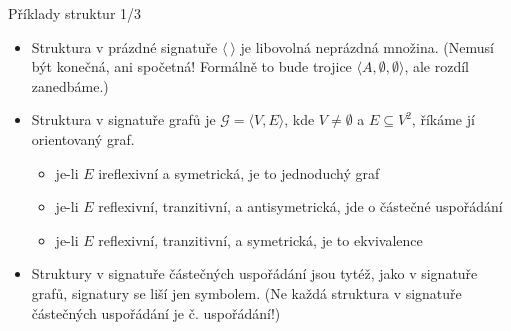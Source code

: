 \documentclass{beamer}
\begin{document}
\begin{frame}{Příklady struktur 1/3}
    
    \begin{itemize}
        \item Struktura \alert{v prázdné signatuře} $\langle\ \rangle$ je libovolná neprázdná množina. (Nemusí být konečná, ani spočetná! Formálně to bude trojice $\langle A,\emptyset,\emptyset\rangle$, ale rozdíl zanedbáme.)            

        \item Struktura \alert{v signatuře grafů} je $\mathcal G=\langle V,E\rangle$, kde $V\neq\emptyset$ a $E\subseteq V^2$, říkáme jí \alert{orientovaný graf}. 
        \begin{itemize}
            \item je-li $E$ ireflexivní a symetrická, je to \alert{jednoduchý} graf
            \item je-li $E$ reflexivní, tranzitivní, a antisymetrická, jde o \alert{částečné uspořádání}
            \item je-li $E$ reflexivní, tranzitivní, a symetrická, je to \alert{ekvivalence}
        \end{itemize}
        \item Struktury \alert{v signatuře částečných uspořádání} jsou tytéž, jako v signatuře grafů, signatury se liší jen symbolem. (Ne každá struktura v signatuře částečných uspořádání je č. uspořádání!)
    \end{itemize}

\end{frame}
\end{document}
